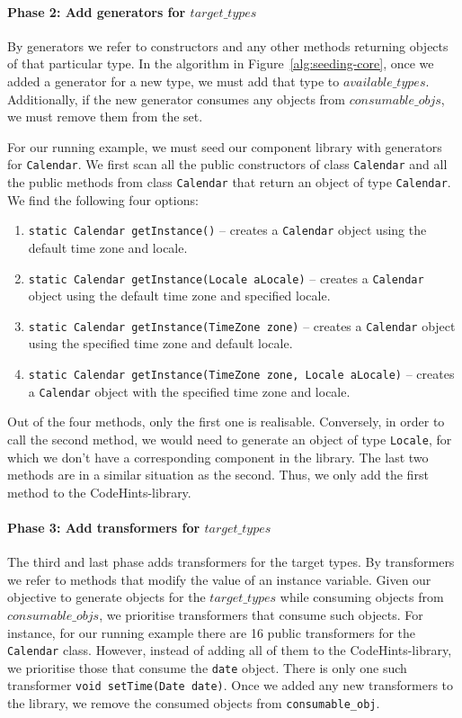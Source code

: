 \documentclass[10pt,conference]{IEEEtran}
\begin{document}
\paragraph{{\bf Phase 2: Add generators for $target\_types$}}

By generators we refer to constructors and any other methods returning objects of that particular type.
In the algorithm in Figure~\ref{alg:seeding-core},
once we added a generator for a new type, we must add that type to $available\_types$.
Additionally, if the new generator consumes any objects from $consumable\_objs$,
we must remove them from the set.

For our running example, we must seed our component library with generators for \texttt{Calendar}.
%
We first scan all the public constructors of class \texttt{Calendar}
and all the public methods from class \texttt{Calendar} that return an object of type \texttt{Calendar}. We find the following four options:

\begin{enumerate}
  \item \texttt{static Calendar	getInstance()} -- creates a \texttt{Calendar} object using the default time zone and locale.
  \item \texttt{static Calendar getInstance(Locale aLocale)} -- creates a \texttt{Calendar} object using the default time zone and specified locale.
  \item \texttt{static Calendar	getInstance(TimeZone zone)} -- creates a \texttt{Calendar} object using the specified time zone and default locale.
  \item \texttt{static Calendar	getInstance(TimeZone zone, Locale aLocale)} -- creates a \texttt{Calendar} object with the specified time zone and locale.
\end{enumerate}

Out of the four methods,
only the first one is realisable. Conversely, in order to call the second method, we would need to generate an object of type \texttt{Locale},
for which we don't have a corresponding component in the library.
The last two methods are in a similar situation as the second. Thus, we only add the first method to the CodeHints-library.

\paragraph{{\bf Phase 3: Add transformers for $target\_types$}}
The third and last phase adds  transformers for the target types.
By transformers we refer to methods that modify the value of an instance variable.
Given our objective to generate objects for the $target\_types$ while consuming objects from $consumable\_objs$,
we prioritise transformers that consume such objects.
For instance, for our running example there are 16 public transformers for the \texttt{Calendar} class.
However, instead of adding all of them to the CodeHints-library, we prioritise those that
consume the \texttt{date} object. There is only one such transformer \texttt{void setTime(Date date)}.
Once we added any new transformers to the library, we remove the consumed objects from \texttt{consumable\_obj}.
\end{document}
